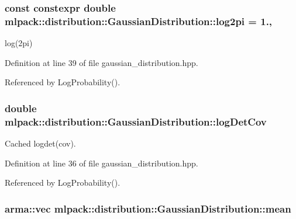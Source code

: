 \subsubsection[{log2pi}]{\setlength{\rightskip}{0pt plus 5cm}const constexpr double mlpack\+::distribution\+::\+Gaussian\+Distribution\+::log2pi = 1.\hspace{0.3cm}{\ttfamily [static]}, {\ttfamily [private]}}\label{classmlpack_1_1distribution_1_1GaussianDistribution_a9e14f26de8635cad1e1fd33ea63bd3b2}


log(2pi) 



Definition at line 39 of file gaussian\+\_\+distribution.\+hpp.



Referenced by Log\+Probability().

\subsubsection[{log\+Det\+Cov}]{\setlength{\rightskip}{0pt plus 5cm}double mlpack\+::distribution\+::\+Gaussian\+Distribution\+::log\+Det\+Cov\hspace{0.3cm}{\ttfamily [private]}}\label{classmlpack_1_1distribution_1_1GaussianDistribution_ab25ba64193df7f17b0106fe40814ea52}


Cached logdet(cov). 



Definition at line 36 of file gaussian\+\_\+distribution.\+hpp.



Referenced by Log\+Probability().

\subsubsection[{mean}]{\setlength{\rightskip}{0pt plus 5cm}arma\+::vec mlpack\+::distribution\+::\+Gaussian\+Distribution\+::mean\hspace{0.3cm}{\ttfamily [private]}}\label{classmlpack_1_1distribution_1_1GaussianDistribution_a792a82012b34799267f3840bbb980470}


